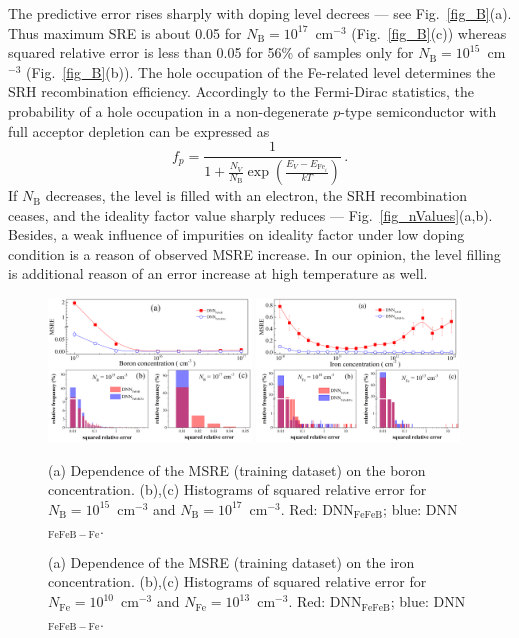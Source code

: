 \documentclass[num-refs]{wiley-article} %
\begin{document}
The predictive error rises sharply with doping level decrees --- see Fig.~\ref{fig_B}(a).
Thus maximum SRE is about 0.05 for $N_\mathrm{B}=10^{17}$~cm$^{-3}$ (Fig.~\ref{fig_B}(c))
whereas squared relative error is less than 0.05 for 56\% of samples only
for $N_\mathrm{B}=10^{15}$~cm$^{-3}$ (Fig.~\ref{fig_B}(b)).
The hole occupation of the Fe-related level determines the SRH recombination efficiency.
Accordingly to the Fermi-Dirac statistics, the probability of a hole
occupation in a non-degenerate $p$-type semiconductor with full acceptor depletion can be expressed as
\begin{equation}
\label{eqfp}
 f_p=\frac{1}{1+\frac{N_V}{N_\mathrm{B}}\exp\left(\frac{E_V-E_{\mathrm{Fe}_i}}{kT}\right)}\,.
\end{equation}
If $N_\mathrm{B}$ decreases, the level is filled with an electron,
the SRH recombination ceases, and the ideality factor value sharply reduces  --- Fig.~\ref{fig_nValues}(a,b).
Besides, a weak influence of impurities on ideality factor under low doping condition is a reason
of observed MSRE increase.
In our opinion, the level filling is additional reason of an error increase at high temperature as well.


\begin{figure}[tb]
\centering
\includegraphics[width=0.48\textwidth]{F6} \hfill
\includegraphics[width=0.48\textwidth]{F7} \\
\parbox[t]{0.48\textwidth}
{\caption{(a) Dependence of the MSRE (training dataset) on the boron concentration.
(b),(c) Histograms of squared  relative error for $N_\mathrm{B}=10^{15}$~cm$^{-3}$ and $N_\mathrm{B}=10^{17}$~cm$^{-3}$.
Red: DNN$_\mathrm{FeFeB}$; blue: DNN$_\mathrm{FeFeB-Fe}$.
}
\label{fig_B}} \hfill
\parbox[t]{0.48\textwidth}{\caption{(a) Dependence of the MSRE (training dataset) on the iron concentration.
(b),(c) Histograms of squared  relative error for $N_\mathrm{Fe}=10^{10}$~cm$^{-3}$ and $N_\mathrm{Fe}=10^{13}$~cm$^{-3}$.
Red: DNN$_\mathrm{FeFeB}$; blue: DNN$_\mathrm{FeFeB-Fe}$.}
\label{fig_Fe}}
\end{figure}
\end{document}

